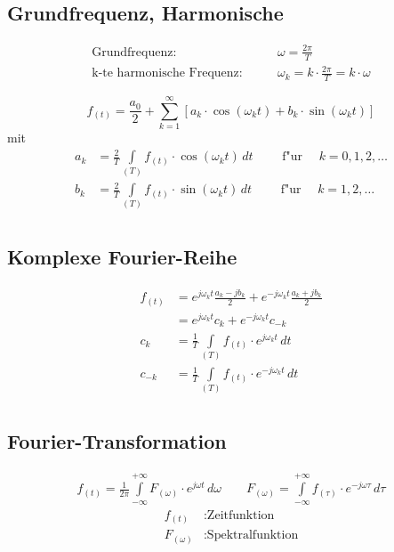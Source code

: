 \subsection{Grundfrequenz, Harmonische}
\begin{align}
\text{Grundfrequenz:}\qquad & \omega = \frac{2\pi}{T} \\
\text{k-te harmonische Frequenz:}\qquad & \omega_k = k\cdot\frac{2\pi}{T} = k\cdot\omega
\end{align}

\begin{equation*}
	f_{(t)} = \frac{a_0}{2}+\sum_{k=1}^\infty\left[{a_k\cdot\cos(\omega_k t)+b_k\cdot\sin(\omega_k t)}\right]
\end{equation*}
mit
\begin{align*}
	a_k &= \frac{2}{T}\int\limits_{(T)} f_{(t)}\cdot\cos(\omega_k t)\,dt\qquad\text{ f"ur }\quad k=0,1,2,\ldots \\
	b_k &= \frac{2}{T}\int\limits_{(T)} f_{(t)}\cdot\sin(\omega_k t)\,dt\qquad\text{ f"ur }\quad k=1,2,\ldots \\
\end{align*}

\subsection{Komplexe Fourier-Reihe}
\begin{align}
	f_{(t)} &= e^{j\omega_k t}\frac{a_k-jb_k}{2}+e^{-j\omega_k t}\frac{a_k+jb_k}{2} \\
	&= e^{j\omega_k t}c_k+e^{-j\omega_k t}c_{-k} \\
	c_k &= \frac{1}{T}\int\limits_{(T)} f_{(t)}\cdot e^{j\omega_k t}\,dt \\
	c_{-k} &= \frac{1}{T}\int\limits_{(T)} f_{(t)}\cdot e^{-j\omega_k t}\,dt \\
\end{align}

\subsection{Fourier-Transformation}
\begin{gather*}
	f_{(t)}=\frac{1}{2\pi}\int\limits_{-\infty}^{+\infty}F_{(\omega)}\cdot e^{j\omega t}\,d\omega
	\qquad
	F_{(\omega)}=\int\limits_{-\infty}^{+\infty} f_{(\tau)}\cdot e^{-j\omega\tau}\,d\tau
\end{gather*}
\begin{align*}
	f_{(t)} & :\text{Zeitfunktion} \\
	F_{(\omega)} & :\text{Spektralfunktion}
\end{align*}

